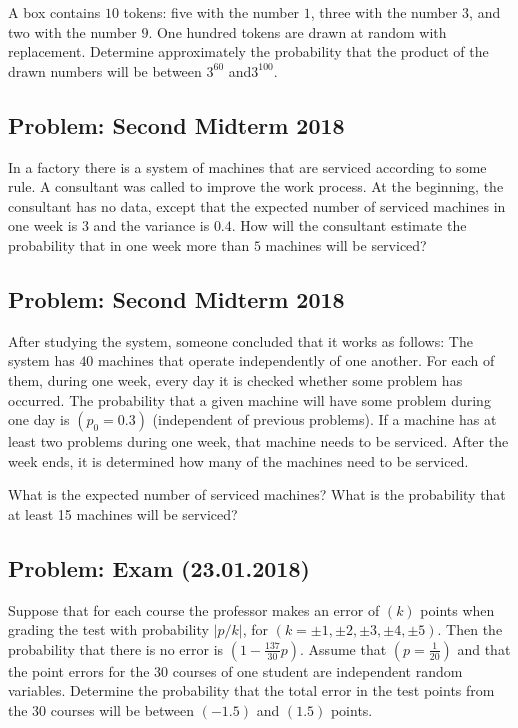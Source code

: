\documentclass[a4paper, 12pt]{article}
\begin{document}
A box contains $10$ tokens: five with the number $1$, three with the number $3$, and two with the number $9$. One hundred tokens are drawn at random with replacement. Determine approximately the probability that the product of the drawn numbers will be between $3^{60}$ and$ 3^{100}$.


\subsection{Problem: Second Midterm 2018}

In a factory there is a system of machines that are serviced according to some rule. A consultant was called to improve the work process. At the beginning, the consultant has no data, except that the expected number of serviced machines in one week is $3$ and the variance is $0.4$. How will the consultant estimate the probability that in one week more than $5$ machines will be serviced?



\subsection{Problem: Second Midterm 2018}

After studying the system, someone concluded that it works as follows: The system has $40$ machines that operate independently of one another. For each of them, during one week, every day it is checked whether some problem has occurred. The probability that a given machine will have some problem during one day is $(p_0 = 0.3)$ (independent of previous problems). If a machine has at least two problems during one week, that machine needs to be serviced. After the week ends, it is determined how many of the machines need to be serviced.

What is the expected number of serviced machines? What is the probability that at least 15 machines will be serviced?



\subsection{Problem: Exam (23.01.2018)}
Suppose that for each course the professor makes an error of $(k)$ points when grading the test with probability
$|p/k|$, for $(k = \pm 1, \pm 2, \pm 3, \pm 4, \pm 5)$.
Then the probability that there is no error is $(1 - \frac{137}{30}p)$.
Assume that $(p = \frac{1}{20})$ and that the point errors for the 30 courses of one student are independent random variables. Determine the probability that the total error in the test points from the $30$ courses will be between $(-1.5)$ and $(1.5)$ points.
\end{document}
